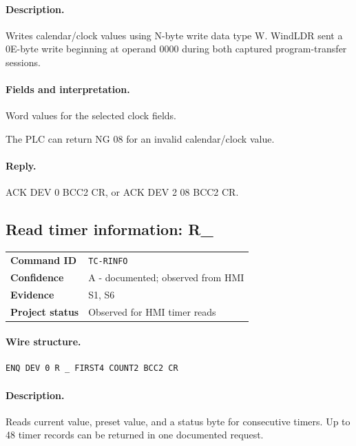 \documentclass[10pt,letterpaper]{article}
\begin{document}
\paragraph{Description.} Writes calendar/clock values using N-byte write data type W. WindLDR sent a 0E-byte write beginning at operand 0000 during both captured program-transfer sessions.
\paragraph{Fields and interpretation.}
\begin{description}[style=nextline,leftmargin=3.2cm,labelwidth=3.0cm,font=\normalfont\bfseries]
\item[DATA\_HEX] Word values for the selected clock fields.
\item[Validation] The PLC can return NG 08 for an invalid calendar/clock value.
\end{description}
\paragraph{Reply.} ACK DEV 0 BCC2 CR, or ACK DEV 2 08 BCC2 CR.

\subsection{Read timer information: R\_}
\begin{tabularx}{\textwidth}{@{}>{\bfseries}p{2.8cm}X@{}}
Command ID & \texttt{TC-RINFO} \\
Confidence & A - documented; observed from HMI \\
Evidence & S1, S6 \\
Project status & Observed for HMI timer reads \\
\end{tabularx}
\vspace{0.35em}
\paragraph{Wire structure.}
\begin{Verbatim}[breaklines=true,breakanywhere=true,fontsize=\small]
ENQ DEV 0 R _ FIRST4 COUNT2 BCC2 CR
\end{Verbatim}
\paragraph{Description.} Reads current value, preset value, and a status byte for consecutive timers. Up to 48 timer records can be returned in one documented request.
\end{document}
